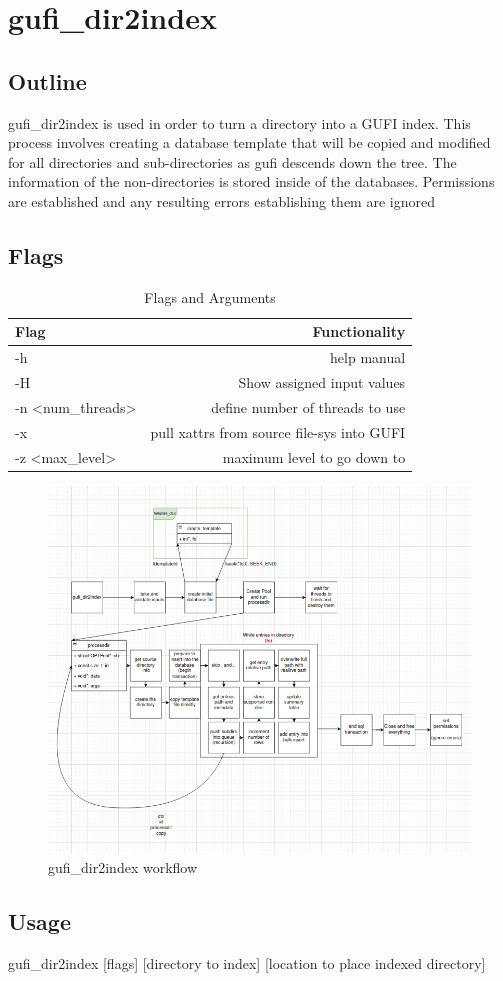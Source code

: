 \section{gufi\_dir2index}

\subsection{Outline}
gufi\_dir2index is used in order to turn a directory into a GUFI index. This process involves creating a database template that will be copied and modified for all directories and sub-directories as gufi descends down the tree. The information of the non-directories is stored inside of the databases. Permissions are established and any resulting errors establishing them are ignored

\subsection{Flags}

\begin{table} [h]
\centering
\begin{tabular}{l|r}
Flag & Functionality \\\hline
-h & help manual \\
-H & Show assigned input values \\
-n \textless num\_threads\textgreater  & define number of threads to use \\
-x & pull xattrs from source file-sys into GUFI \\
-z \textless max\_level\textgreater & maximum level to go down to
\end{tabular}
\caption{\label{tab:widgets}Flags and Arguments}
\end{table}

\begin{figure} [h]
\centering
\includegraphics[width=1.0\textwidth]{images/gufi_dir2index.png}
\caption{\label{fig:gufi_dir2index}gufi\_dir2index workflow}
\end{figure}

\subsection{Usage}
gufi\_dir2index [flags] [directory to index] [location to place indexed directory]


